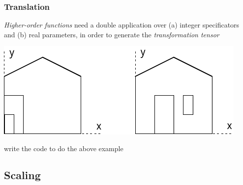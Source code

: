 \documentclass{beamer}
\begin{document}
\begin{frame}[fragile]
\frametitle{Translation}\small

 \emph{Higher-order functions} need a double application over (a) integer specificators and (b) real parameters, in order to generate the \emph{transformation tensor} 

\vfill

\centering\includegraphics[width=0.5\linewidth]{images/smallhouse1}

\vfill

write the code to do the above example

\end{frame}

\subsection{Scaling}
\end{document}
